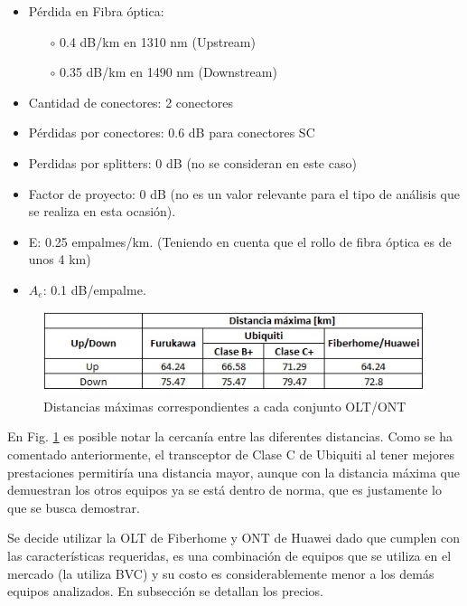 \documentclass[12pt,a4paper]{book}
\begin{document}
\begin{itemize}

\item Pérdida en Fibra óptica:
	\begin{itemize}
 		\item[$\circ$] 0.4 dB/km en 1310 nm (Upstream)
		\item[$\circ$] 0.35 dB/km en 1490 nm (Downstream)
    \end{itemize}
\item Cantidad de conectores: 2 conectores
\item Pérdidas por conectores: 0.6 dB para conectores SC
\item Perdidas por splitters: 0 dB (no se consideran en este caso)
\item Factor de proyecto: 0 dB (no es un valor relevante para el tipo de
análisis que se realiza en esta ocasión).
\item E: 0.25 empalmes/km. (Teniendo en cuenta que el rollo de fibra
óptica es de unos 4 km)
\item $A_e$: 0.1 dB/empalme.
\end{itemize}




\begin{figure} [H]
\centering
\includegraphics[width = 12 cm]{../figuras/DistMaxONT_OLT_acc.jpg}
\caption{Distancias máximas correspondientes a cada conjunto OLT/ONT}
\label{Tabla_DisMax_ONT_OLT_Acc}
\end{figure}

\medskip

En Fig. \ref{Tabla_DisMax_ONT_OLT_Acc} es posible notar la
cercanía entre las diferentes distancias. Como se ha comentado anteriormente, el
transceptor de Clase C de Ubiquiti al tener mejores prestaciones permitiría
una distancia mayor, aunque con la distancia máxima que demuestran los
otros equipos ya se está dentro de norma, que es justamente lo que se busca
demostrar. 

\medskip

Se decide utilizar la OLT de Fiberhome y ONT de Huawei dado que cumplen con las características requeridas, es una combinación de equipos que se utiliza en el mercado (la utiliza BVC) y su costo es considerablemente menor a los demás equipos analizados. En subsección \label{Colocar_seccion_costo_de_red} se detallan los precios. 
\end{document}

